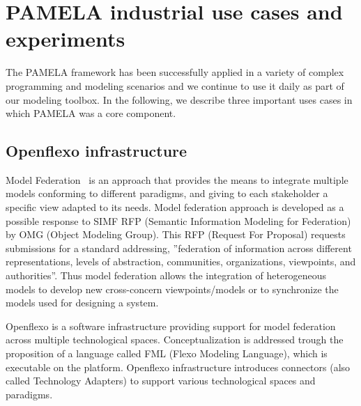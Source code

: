 


\section{PAMELA industrial use cases and experiments}
\label{sec:validation}

 The PAMELA framework has been successfully applied in a variety of complex programming and modeling scenarios and we continue to use it daily as part of our modeling toolbox. In the following, we describe three important uses cases in which PAMELA was a core component.



\subsection{Openflexo infrastructure}

Model Federation~\cite{Golra2016} is an approach that provides the means to
integrate multiple models conforming to different paradigms, and giving to each
stakeholder a specific view adapted to its needs. Model federation approach is
developed as a possible response to SIMF RFP (Semantic Information Modeling for
Federation)~\cite{simf-rfp} by OMG (Object Modeling Group). This RFP (Request For Proposal)
requests submissions for a standard addressing, ”federation of information
across different representations, levels of abstraction, communities,
organizations, viewpoints, and authorities”. Thus model federation allows the
integration of heterogeneous models to develop new cross-concern
viewpoints/models or to synchronize the models used for designing a system. 

Openflexo\cite{OpenflexoWebSite} is a software infrastructure providing support
for model federation across multiple technological spaces. Conceptualization is
addressed trough the proposition of a language called FML (Flexo Modeling
Language), which is executable on the platform. Openflexo infrastructure
introduces connectors (also called Technology Adapters) to support various
technological spaces and paradigms.

